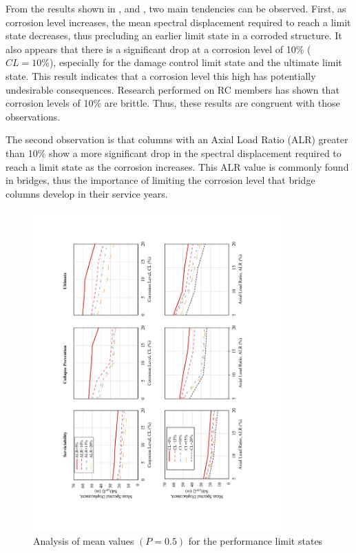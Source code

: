 From the results shown in , and , two main tendencies can be observed. First, as corrosion level increases, the mean spectral displacement required to reach a limit state decreases, thus precluding an earlier limit state in a corroded structure. It also appears that there is a significant drop at a corrosion level of 10\% ($CL=10\%$), especially for the damage control limit state and the ultimate limit state. This result indicates that a corrosion level this high has potentially undesirable consequences. Research performed on RC members has shown that corrosion levels of 10\% are brittle. Thus, these results are congruent with those observations.

The second observation is that columns with an Axial Load Ratio (ALR) greater than 10\% show a more significant drop in the spectral displacement required to reach a limit state as the corrosion increases. This ALR value is commonly found in bridges, thus the importance of limiting the corrosion level that bridge columns develop in their service years.

\begin{figure}[htbp]
	\centering
	\includegraphics[width=0.85\textwidth]{VAC Thesis 2.0/Chapter-5/figs/Analysis_of_Mean_SDs.pdf}
	\caption{Analysis of mean values $(P=0.5)$ for the performance limit states}
	\label{fig:mean_prob_vs_CL}
\end{figure}

